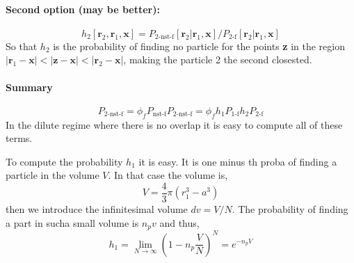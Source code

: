 \paragraph*{Second option (may be better): }

\begin{equation}
    h_2[\textbf{r}_2,\textbf{r}_1,\textbf{x}]
    = 
    P_\text{2-nst-f}[\textbf{r}_2|\textbf{r}_1,\textbf{x}]
    / 
    P_\text{2-f}[\textbf{r}_2|\textbf{r}_1,\textbf{x}]
\end{equation}
So that $h_2$ is the probability of finding no particle for the points \textbf{z} in the region $|\textbf{r}_1- \textbf{x}|<|\textbf{z}- \textbf{x}|<|\textbf{r}_2- \textbf{x}|$, making the particle 2 the second closested. 



\paragraph*{Summary}

\begin{equation}
    P_\text{2-nst-f}
    = 
    \phi_f 
    P_\text{nst-f}
    P_\text{2-nst-f}
    = 
    \phi_f 
    h_1 P_\text{1-f}
    h_2 P_\text{2-f}
\end{equation}
In the dilute regime where there is no overlap it is easy to compute all of these terms. 


To compute the probability $h_1$ it is easy. 
It is one minus th proba of finding a particle in the volume $V$. 
In that case the volume is, 
\begin{equation}
    V = \frac{4}{3}\pi (r_1^3 - a^3)
\end{equation}
then we introduce the infinitesimal volume $dv = V / N$. The probability of finding a part in sucha small volume is $n_p v$ and thus, 
\begin{equation}
    h_1 
    = \lim_{N\to\infty}
    (1-n_p \frac{V}{N})^N 
    = e^{-n_p V}
\end{equation}

